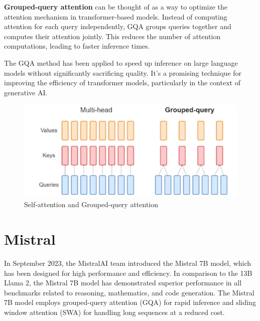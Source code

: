 \documentclass[PMI,VKR]{HSEUniversity}
\begin{document}
\textbf{Grouped-query attention} can be thought of as a way to optimize the attention mechanism in transformer-based models. 
Instead of computing attention for each query independently, GQA groups queries together and computes their attention jointly. This reduces the number of attention computations, leading to faster inference times.

The GQA method has been applied to speed up inference on large language models without significantly sacrificing quality. 
It's a promising technique for improving the efficiency of transformer models, particularly in the context of generative AI.

\begin{figure}[h]
    \centering
    \includegraphics[scale=1]{img/gqa.png}
    \caption{Self-attention and Grouped-query attention}
\end{figure}


\section{Mistral}

In September 2023, the MistralAI team introduced the Mistral 7B model, which has been designed for high performance and efficiency. 
In comparison to the 13B Llama 2, the Mistral 7B model has demonstrated superior performance in all benchmarks related to reasoning, mathematics, and code generation. 
The Mistral 7B model employs grouped-query attention (GQA) for rapid inference and sliding window attention (SWA) for handling long sequences at a reduced cost.
\end{document}
